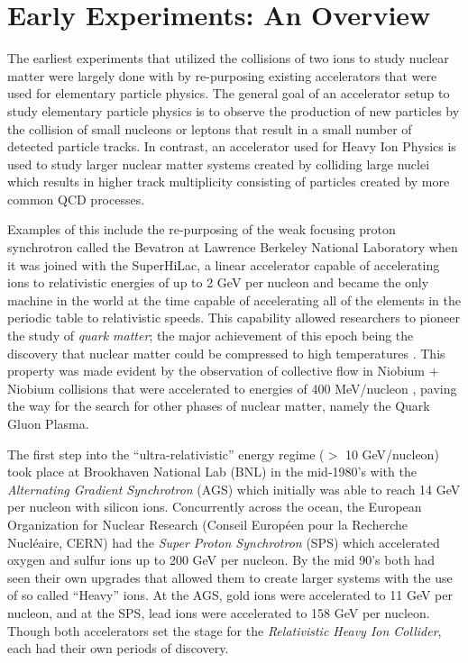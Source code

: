 \section{Early Experiments: An Overview} \label{sect:earlyexperiments}
The earliest experiments that utilized the collisions of two ions to study nuclear matter were largely done with by re-purposing existing accelerators that were used for elementary particle physics. The general goal of an accelerator setup to study elementary particle physics is to observe the production of new particles by the collision of small nucleons or leptons that result in a small number of detected particle tracks. In contrast, an accelerator used for Heavy Ion Physics is used to study larger nuclear matter systems created by colliding large nuclei which results in higher track multiplicity consisting of particles created by more common QCD processes. 

Examples of this include the re-purposing of the weak focusing proton synchrotron called the Bevatron at Lawrence Berkeley National Laboratory when it was joined with the SuperHiLac, a linear accelerator capable of accelerating ions to relativistic energies of up to 2 GeV per nucleon and became the only machine in the world at the time capable of accelerating all of the elements in the periodic table to relativistic speeds. This capability allowed researchers to pioneer the study of \textit{quark matter}\citep{bevalac9lives}; the major achievement of this epoch being the discovery that nuclear matter could be compressed to high temperatures \citep{ROBINSON857}. This property was made evident by the observation of collective flow in Niobium + Niobium collisions that were accelerated to energies of 400 MeV/nucleon \citep{PhysRevLett.52.1590}, paving the way for the search for other phases of nuclear matter, namely the Quark Gluon Plasma.

The first step into the ``ultra-relativistic'' energy regime ($>$ 10 GeV/nucleon) took place at Brookhaven National Lab (BNL) in the mid-1980's with the \textit{Alternating Gradient Synchrotron} (AGS) which initially was able to reach 14 GeV per nucleon with silicon ions. Concurrently across the ocean, the European Organization for Nuclear Research (Conseil Europ\'{e}en pour la Recherche Nucl\'{e}aire, CERN) had the \textit{Super Proton Synchrotron} (SPS) which accelerated oxygen and sulfur ions up to 200 GeV per nucleon. By the mid 90's both had seen their own upgrades that allowed them to create larger systems with the use of so called ``Heavy'' ions. At the AGS, gold ions were accelerated to 11 GeV per nucleon, and at the SPS, lead ions were accelerated to 158 GeV per nucleon\citep{wojciechphenomenology}. Though both accelerators set the stage for the \textit{Relativistic Heavy Ion Collider}, each had their own periods of discovery. 

